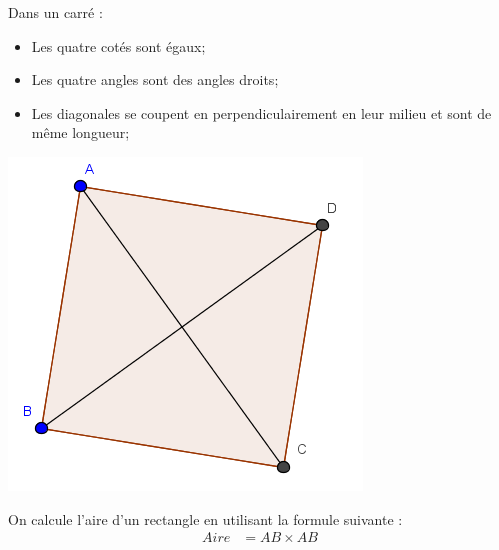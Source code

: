\documentclass[12pt,a4paper]{article}
\begin{document}
\begin{myprops}
	
	\begin{multicols}{2}
		
		Dans un carré :
		\begin{itemize}
			\item Les quatre cotés sont égaux;
			\item Les quatre angles sont des angles droits;
			\item Les diagonales se coupent en perpendiculairement en leur milieu et sont de même longueur;
			
		\end{itemize}
		
		
		\includegraphics[scale=0.6]{./img/carre}
	\end{multicols}
	
\end{myprops}

\begin{mymeth}
	On calcule l'aire d'un rectangle en utilisant la formule suivante :
	\vspace*{-1cm}
	\begin{align*}
	Aire &= AB \times AB
	\end{align*}
\end{mymeth}
\end{document}
